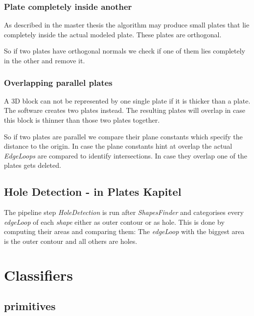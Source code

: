 \documentclass[../ClassicThesis.tex]{subfiles}
\begin{document}
\subsection{Plate completely inside another}

As described in the master thesis the algorithm may produce small plates that lie completely inside the actual modeled plate. These plates are orthogonal.

So if two plates have orthogonal normals we check if one of them lies completely in the other and remove it.


\subsection{Overlapping parallel plates}

A 3D block can not be represented by one single plate if it is thicker than a plate. The software creates two plates instead. The resulting plates will overlap in case this block is thinner than those two plates together.

So if two plates are parallel we compare their plane constants which specify the distance to the origin. In case the plane constants hint at overlap the actual \emph{EdgeLoops} are compared to identify intersections. In case they overlap one of the plates gets deleted.










\section{Hole Detection - in Plates Kapitel}

The pipeline step \emph{HoleDetection} is run after \emph{ShapesFinder} and categorises every \emph{edgeLoop} of each \emph{shape} either as outer contour or as hole. This is done by computing their areas and comparing them: The \emph{edgeLoop} with the biggest area is the outer contour and all others are holes.












\chapter{Classifiers}
\section{primitives}
\end{document}
